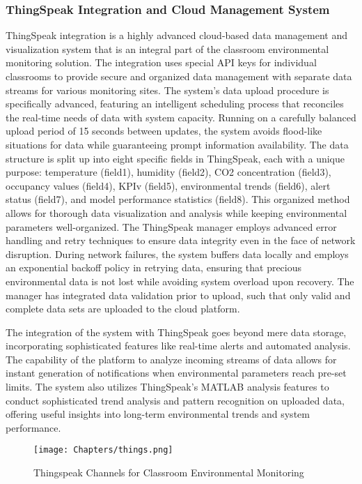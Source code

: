\subsubsection{ThingSpeak Integration and Cloud Management System}
ThingSpeak integration is a highly advanced cloud-based data management and visualization system that is an integral part of the classroom environmental monitoring solution. The integration uses special API keys for individual classrooms to provide secure and organized data management with separate data streams for various monitoring sites. The system's data upload procedure is specifically advanced, featuring an intelligent scheduling process that reconciles the real-time needs of data with system capacity. Running on a carefully balanced upload period of 15 seconds between updates, the system avoids flood-like situations for data while guaranteeing prompt information availability. The data structure is split up into eight specific fields in ThingSpeak, each with a unique purpose: temperature (field1), humidity (field2), CO2 concentration (field3), occupancy values (field4), KPIv (field5), environmental trends (field6), alert status (field7), and model performance statistics (field8). This organized method allows for thorough data visualization and analysis while keeping environmental parameters well-organized.
The ThingSpeak manager employs advanced error handling and retry techniques to ensure data integrity even in the face of network disruption. During network failures, the system buffers data locally and employs an exponential backoff policy in retrying data, ensuring that precious environmental data is not lost while avoiding system overload upon recovery. The manager has integrated data validation prior to upload, such that only valid and complete data sets are uploaded to the cloud platform.

The integration of the system with ThingSpeak goes beyond mere data storage, incorporating sophisticated features like real-time alerts and automated analysis. The capability of the platform to analyze incoming streams of data allows for instant generation of notifications when environmental parameters reach pre-set limits. The system also utilizes ThingSpeak's MATLAB analysis features to conduct sophisticated trend analysis and pattern recognition on uploaded data, offering useful insights into long-term environmental trends and system performance.

\begin{figure}[h!]
		\centering
	\texttt{[image: Chapters/things.png]}
		\caption{Thingspeak Channels for Classroom Environmental Monitoring}
\end{figure}

